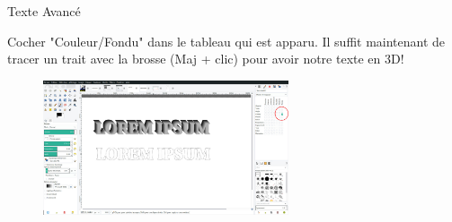 \documentclass[10pt,svgnames,usenames,table]{beamer}
\begin{document}
\begin{frame}{Texte Avancé}
\begin{enumerate}
{			Cocher "Couleur/Fondu" dans le tableau qui est apparu. Il suffit maintenant de tracer un trait avec la brosse (Maj + clic) pour avoir notre texte en 3D!		
			\begin{figure}
			\centering
			\includegraphics[height=150px]{Images/text/3D4}
			\end{figure}
		}	
		\end{enumerate}
\end{frame}
\end{document}
